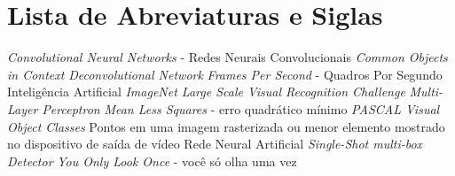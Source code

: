 \chapter*{Lista de Abreviaturas e Siglas}


\begin{acronym}
 {\textit{Convolutional Neural Networks} - Redes Neurais Convolucionais}
 {\textit{Common Objects in Context}}
 {\textit{Deconvolutional Network}}
 {\textit{Frames Per Second} - Quadros Por Segundo}
 {Inteligência Artificial}
 {\textit{ImageNet Large Scale Visual Recognition Challenge}}
 {\textit{Multi-Layer Perceptron}}
 {\textit{Mean Less Squares} - erro quadrático mínimo}
 {\textit{PASCAL Visual Object Classes}}
 {Pontos em uma imagem rasterizada ou menor elemento mostrado no dispositivo de saída de vídeo}
 {Rede Neural Artificial}
 {\textit{Single-Shot multi-box Detector}}
 {\textit{You Only Look Once} - você só olha uma vez}
\end{acronym}